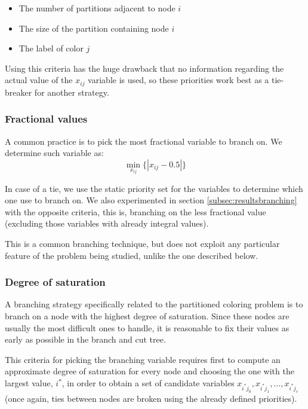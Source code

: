 \begin{itemize}
\item{The number of partitions adjacent to node $i$}
\item{The size of the partition containing node $i$}
\item{The label of color $j$}
\end{itemize}

Using this criteria has the huge drawback that no information regarding the actual value of the $x_{ij}$ variable is used, so these priorities work best as a tie-breaker for another strategy.

\subsubsection*{Fractional values}
\label{subsubsec:alg:branch:frac}

A common practice is to pick the most fractional variable to branch on. We determine such variable as:
\[
\min_{x_{ij}} \{ |x_{ij} - 0.5| \}
\]

In case of a tie, we use the static priority set for the variables to determine which one use to branch on. We also experimented in section \ref{subsec:resultsbranching} with the opposite criteria, this is, branching on the less fractional value (excluding those variables with already integral values).

This is a common branching technique, but does not exploit any particular feature of the problem being studied, unlike the one described below.

\subsubsection*{Degree of saturation}
\label{subsubsec:alg:branch:dsatur}

A branching strategy specifically related to the partitioned coloring problem is to branch on a node with the highest degree of saturation. Since these nodes are usually the most difficult ones to handle, it is reasonable to fix their values as early as possible in the branch and cut tree.

This criteria for picking the branching variable requires first to compute an approximate degree of saturation for every node and choosing the one with the largest value, $i^*$, in order to obtain a set of candidate variables $x_{i^*j_0}, x_{i^*j_1}, \ldots, x_{i^*j_c}$ (once again, ties between nodes are broken using the already defined priorities).


